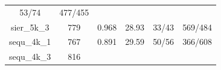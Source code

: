\documentclass[twoside,12pt,final]{ucthesis-CA2012}
\begin{document}
\begin{ucmainmatter}
\begin{longtable}[]{@{}cccccc@{}}
\begin{minipage}[t]{0.18\columnwidth}
53/74\strut
\end{minipage} & \begin{minipage}[t]{0.22\columnwidth}\centering\strut
477/455\strut
\end{minipage}\tabularnewline
\begin{minipage}[t]{0.11\columnwidth}\centering\strut
sier\_5k\_3\strut
\end{minipage} & \begin{minipage}[t]{0.07\columnwidth}\centering\strut
779\strut
\end{minipage} & \begin{minipage}[t]{0.11\columnwidth}\centering\strut
0.968\strut
\end{minipage} & \begin{minipage}[t]{0.13\columnwidth}\centering\strut
28.93\strut
\end{minipage} & \begin{minipage}[t]{0.18\columnwidth}\centering\strut
33/43\strut
\end{minipage} & \begin{minipage}[t]{0.22\columnwidth}\centering\strut
569/484\strut
\end{minipage}\tabularnewline
\begin{minipage}[t]{0.11\columnwidth}\centering\strut
sequ\_4k\_1\strut
\end{minipage} & \begin{minipage}[t]{0.07\columnwidth}\centering\strut
767\strut
\end{minipage} & \begin{minipage}[t]{0.11\columnwidth}\centering\strut
0.891\strut
\end{minipage} & \begin{minipage}[t]{0.13\columnwidth}\centering\strut
29.59\strut
\end{minipage} & \begin{minipage}[t]{0.18\columnwidth}\centering\strut
50/56\strut
\end{minipage} & \begin{minipage}[t]{0.22\columnwidth}\centering\strut
366/608\strut
\end{minipage}\tabularnewline
\begin{minipage}[t]{0.11\columnwidth}\centering\strut
sequ\_4k\_3\strut
\end{minipage} & \begin{minipage}[t]{0.07\columnwidth}\centering\strut
816\strut
\end{minipage} & \begin{minipage}[t]{0.11\columnwidth}\centering\strut

\end{minipage}
\end{longtable}
\end{ucmainmatter}
\end{document}

